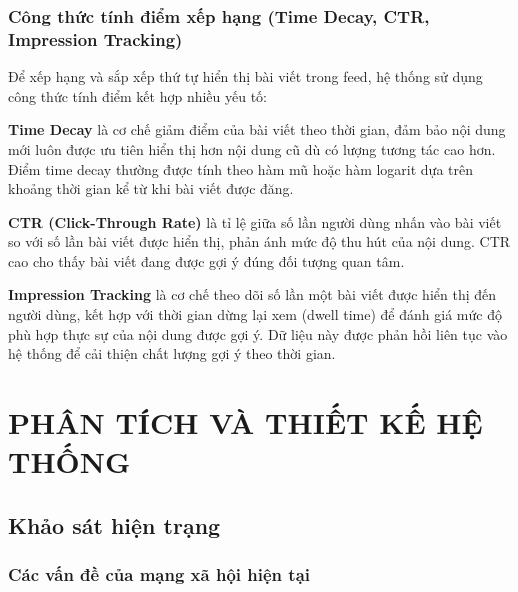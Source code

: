 \subsection{Công thức tính điểm xếp hạng (Time Decay, CTR, Impression
Tracking)}\label{cuxf4ng-thux1ee9c-tuxednh-ux111iux1ec3m-xux1ebfp-hux1ea1ng-time-decay-ctr-impression-tracking}

Để xếp hạng và sắp xếp thứ tự hiển thị bài viết trong feed, hệ thống sử
dụng công thức tính điểm kết hợp nhiều yếu tố:

\textbf{Time Decay} là cơ chế giảm điểm của bài viết theo thời gian, đảm
bảo nội dung mới luôn được ưu tiên hiển thị hơn nội dung cũ dù có lượng
tương tác cao hơn. Điểm time decay thường được tính theo hàm mũ hoặc hàm
logarit dựa trên khoảng thời gian kể từ khi bài viết được đăng.

\textbf{CTR (Click-Through Rate)} là tỉ lệ giữa số lần người dùng nhấn
vào bài viết so với số lần bài viết được hiển thị, phản ánh mức độ thu
hút của nội dung. CTR cao cho thấy bài viết đang được gợi ý đúng đối
tượng quan tâm.

\textbf{Impression Tracking} là cơ chế theo dõi số lần một bài viết được
hiển thị đến người dùng, kết hợp với thời gian dừng lại xem (dwell time)
để đánh giá mức độ phù hợp thực sự của nội dung được gợi ý. Dữ liệu này
được phản hồi liên tục vào hệ thống để cải thiện chất lượng gợi ý theo
thời gian.

\chapter{PHÂN TÍCH VÀ THIẾT KẾ HỆ
THỐNG}\label{phuxe2n-tuxedch-vuxe0-thiux1ebft-kux1ebf-hux1ec7-thux1ed1ng}


\section{\texorpdfstring{Khảo sát hiện
trạng}{ Khảo sát hiện trạng}}\label{khux1ea3o-suxe1t-hiux1ec7n-trux1ea1ng}

\subsection{\texorpdfstring{Các vấn đề của mạng xã hội hiện tại
}{Các vấn đề của mạng xã hội hiện tại }}\label{cuxe1c-vux1ea5n-ux111ux1ec1-cux1ee7a-mux1ea1ng-xuxe3-hux1ed9i-hiux1ec7n-tux1ea1i}

